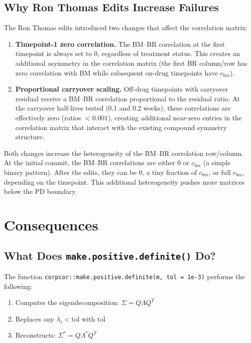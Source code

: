 \documentclass[11pt]{article}
\begin{document}
\subsection{Why Ron Thomas Edits Increase Failures}

The Ron Thomas edits introduced two changes that affect the
correlation matrix:

\begin{enumerate}
\item \textbf{Timepoint-1 zero correlation.} The BM--BR
  correlation at the first timepoint is always set to 0,
  regardless of treatment status. This creates an additional
  asymmetry in the correlation matrix (the first BR column/row
  has zero correlation with BM while subsequent on-drug
  timepoints have $c_{bm}$).

\item \textbf{Proportional carryover scaling.} Off-drug
  timepoints with carryover residual receive a BM--BR
  correlation proportional to the residual ratio. At the
  carryover half-lives tested (0.1 and 0.2 weeks), these
  correlations are effectively zero (ratios $< 0.001$),
  creating additional near-zero entries in the correlation
  matrix that interact with the existing compound symmetry
  structure.
\end{enumerate}

Both changes increase the heterogeneity of the BM--BR
correlation row/column. At the initial commit, the BM--BR
correlations are either 0 or $c_{bm}$ (a simple binary
pattern). After the edits, they can be 0, a tiny fraction of
$c_{bm}$, or full $c_{bm}$, depending on the timepoint.
This additional heterogeneity pushes more matrices below the
PD boundary.

\section{Consequences}

\subsection{What Does \texttt{make.positive.definite()} Do?}

The function \texttt{corpcor::make.positive.definite(m,
tol = 1e-3)} performs the following:

\begin{enumerate}
\item Computes the eigendecomposition: $\Sigma = Q \Lambda Q^T$
\item Replaces any $\lambda_i < \text{tol}$ with $\text{tol}$
\item Reconstructs: $\Sigma^* = Q \Lambda^* Q^T$
\end{enumerate}
\end{document}
